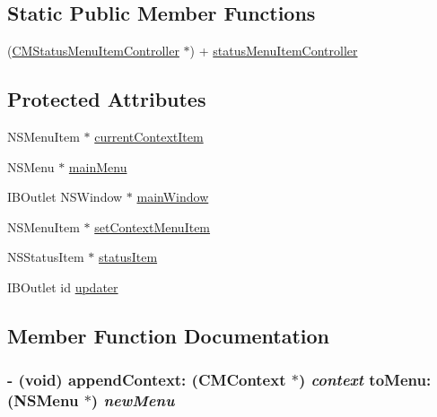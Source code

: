 \subsection*{Static Public Member Functions}
\begin{CompactItemize}
\item 
(\hyperlink{interface_c_m_status_menu_item_controller}{CMStatusMenuItemController} $\ast$) + \hyperlink{interface_c_m_status_menu_item_controller_0b8aadc1a02f1f36173ddb623b648b77}{statusMenuItemController}
\end{CompactItemize}
\subsection*{Protected Attributes}
\begin{CompactItemize}
\item 
NSMenuItem $\ast$ \hyperlink{interface_c_m_status_menu_item_controller_c40a96b86b1c5cd3ab7756179766302e}{currentContextItem}
\item 
NSMenu $\ast$ \hyperlink{interface_c_m_status_menu_item_controller_678496f6afb0fcdf34a33fb7e00d7dfb}{mainMenu}
\item 
IBOutlet NSWindow $\ast$ \hyperlink{interface_c_m_status_menu_item_controller_e5905fa0e384eda7fd573375ebcedb3e}{mainWindow}
\item 
NSMenuItem $\ast$ \hyperlink{interface_c_m_status_menu_item_controller_3e84ec9624ba71ad7413de39f739c364}{setContextMenuItem}
\item 
NSStatusItem $\ast$ \hyperlink{interface_c_m_status_menu_item_controller_543a31a619878459805d339524f83c32}{statusItem}
\item 
IBOutlet id \hyperlink{interface_c_m_status_menu_item_controller_e57a8c3f064507d53476ab69215dd97e}{updater}
\end{CompactItemize}


\subsection{Member Function Documentation}
\hypertarget{interface_c_m_status_menu_item_controller_0168c3814ce904a91051a2cf1119bb0b}{
\subsubsection[appendContext:toMenu:]{\setlength{\rightskip}{0pt plus 5cm}- (void) appendContext: ({\bf CMContext} $\ast$) {\em context}\/ toMenu: (NSMenu $\ast$) {\em newMenu}}}
\label{interface_c_m_status_menu_item_controller_0168c3814ce904a91051a2cf1119bb0b}


